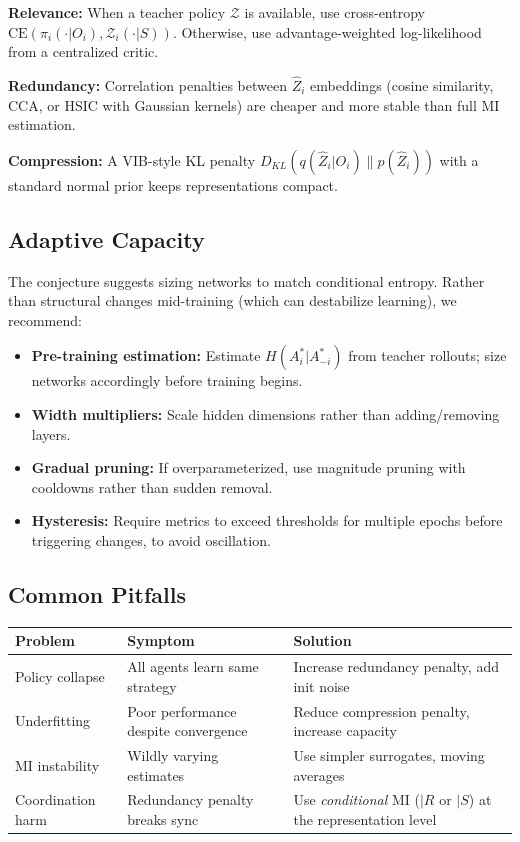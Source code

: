 \documentclass[10pt, letterpaper]{article}
\begin{document}
\textbf{Relevance:} When a teacher policy $\mathcal{Z}$ is available, use cross-entropy $\text{CE}(\pi_i(\cdot|O_i), \mathcal{Z}_i(\cdot|S))$. Otherwise, use advantage-weighted log-likelihood from a centralized critic.

\textbf{Redundancy:} Correlation penalties between $\hat{Z}_i$ embeddings (cosine similarity, CCA, or HSIC with Gaussian kernels) are cheaper and more stable than full MI estimation.

\textbf{Compression:} A VIB-style KL penalty $D_{KL}(q(\hat{Z}_i|O_i) \| p(\hat{Z}_i))$ with a standard normal prior keeps representations compact.

\subsection{Adaptive Capacity}

The conjecture suggests sizing networks to match conditional entropy. Rather than structural changes mid-training (which can destabilize learning), we recommend:
\begin{itemize}
    \item \textbf{Pre-training estimation:} Estimate $H(A_i^*|A_{-i}^*)$ from teacher rollouts; size networks accordingly before training begins.
    \item \textbf{Width multipliers:} Scale hidden dimensions rather than adding/removing layers.
    \item \textbf{Gradual pruning:} If overparameterized, use magnitude pruning with cooldowns rather than sudden removal.
    \item \textbf{Hysteresis:} Require metrics to exceed thresholds for multiple epochs before triggering changes, to avoid oscillation.
\end{itemize}

\subsection{Common Pitfalls}

\begin{center}
\begin{tabular}{lll}
\toprule
\textbf{Problem} & \textbf{Symptom} & \textbf{Solution} \\
\midrule
Policy collapse & All agents learn same strategy & Increase redundancy penalty, add init noise \\
Underfitting & Poor performance despite convergence & Reduce compression penalty, increase capacity \\
MI instability & Wildly varying estimates & Use simpler surrogates, moving averages \\
Coordination harm & Redundancy penalty breaks sync & Use \emph{conditional} MI ($\mid R$ or $\mid S$) at the representation level \\
\bottomrule
\end{tabular}
\end{center}
\end{document}
